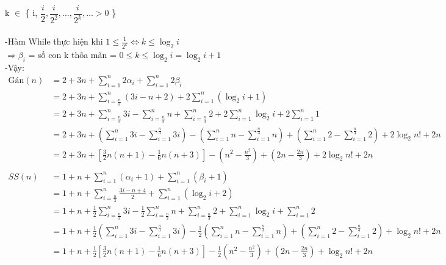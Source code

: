 \documentclass[12pt, letterpaper]{article}
\begin{document}
     k $\in$ \{ i, $\dfrac{i}{2}, \dfrac{i}{2^2}, \ldots, \dfrac{i}{2^k}, \ldots >0$ \} \\ \\
	-Hàm While thực hiện khi $1 \leq \frac{1}{2^k}  \Leftrightarrow k \leq \log_2 i$\\  
	$\Rightarrow \beta_i$ = số \space con k thõa mãn = $0 \leq k \leq \log_2 i = \log_2 i+1$\\
	-Vậy: \\
	$ \begin{aligned}
		\text{Gán}(n) & = 2 + 3n + \sum^{n}_{i = 1} 2 \alpha_i  + \sum^{n}_{i = 1} 2 \beta_i\\
			& = 2 + 3n + \sum^{n}_{i = \frac{n}{3}} (3i -n + 2) + 2 \sum^{n}_{i = 1}(\log_2 i+1)\\
			& = 2 + 3n + \sum^{n}_{i = \frac{n}{3}} 3i - \sum^{n}_{i = \frac{n}{3}} n + \sum^{n}_{i = \frac{n}{3}} 2 + 2 \sum^{n}_{i = 1}\log_2 i + 2 \sum^{n}_{i = 1}1\\
			& = 2 + 3n + (\sum^{n}_{i = 1} 3i - \sum^{\frac{n}{3}}_{i = 1} 3i) - (\sum^{n}_{i = 1} n - \sum^{\frac{n}{3}}_{i = 1} n) + (\sum^{n}_{i = 1} 2 - \sum^{\frac{n}{3}}_{i = 1} 2) + 2 \log_2n! + 2n \\
			& = 2 + 3n + [\frac{3}{2}n(n + 1) - \frac{1}{6}n(n + 3)] - (n^2 - \frac{n^2}{3}) + (2n - \frac{2n}{3}) + 2 \log_2n! + 2n \\
			\\SS(n) & = 1 + n + \sum^{n}_{i = 1} (\alpha_i  + 1) + \sum^{n}_{i = 1} ( \beta_i + 1)\\
			& = 1 + n + \sum^{n}_{i = \frac{n}{3}} \frac{3i - n + 4}{2} + \sum^{n}_{i = 1} (\log_2 i + 2)\\
			& = 1 + n + \frac{1}{2}\sum^{n}_{i = \frac{n}{3}} 3i - \frac{1}{2}\sum^{n}_{i = \frac{n}{3}} n + \sum^{n}_{i = \frac{n}{3}} 2 + \sum^{n}_{i = 1} \log_2 i + \sum^{n}_{i = 1} 2\\
			& = 1 + n + \frac{1}{2}(\sum^{n}_{i = 1} 3i - \sum^{\frac{n}{3}}_{i = 1} 3i) - \frac{1}{2}(\sum^{n}_{i = 1} n - \sum^{\frac{n}{3}}_{i = 1} n) + (\sum^{n}_{i = 1} 2 - \sum^{\frac{n}{3}}_{i = 1} 2) + \log_2n! + 2n \\
			& = 1 + n + \frac{1}{2}[\frac{3}{2}n(n + 1) - \frac{1}{6}n(n + 3)] - \frac{1}{2}(n^2 - \frac{n^2}{3}) + (2n - \frac{2n}{3}) + \log_2n! + 2n \\
	\end{aligned} $ \\
\end{document}
